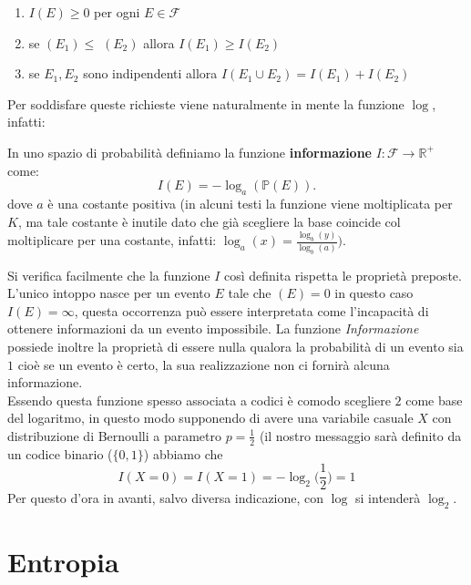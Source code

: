 \begin{enumerate} 
\item $I(E)\geq 0$ per ogni $E\in \mathcal{F}$
\item se \p$(E_1)\leq $ \p$(E_2)$ allora $I(E_1)\geq I(E_2)$ 
\item se $E_1,E_2$ sono indipendenti allora $I(E_1\cup E_2)=I(E_1)+ I(E_2)$
\end{enumerate} 
Per soddisfare queste richieste viene naturalmente in mente la funzione $\log$, infatti:
\begin{defi}
In uno spazio di probabilità \spacep definiamo la funzione \textbf{informazione} $I: \mathcal{F}\to \mathbb{R}^+$ come:
\begin{equation}
I(E)=-\log_a(\mathbb{P} (E)).
\end{equation}
dove $a$ è una costante positiva (in alcuni testi la funzione viene moltiplicata per $K$,  ma tale costante è inutile dato che già scegliere la base coincide col moltiplicare per una costante, infatti: $\log_a(x)=\frac{\log_b(y)}{\log_b(a)} \bigg)$.
\end{defi}

Si verifica facilmente che la funzione $I$ così definita rispetta le proprietà preposte. L'unico intoppo nasce per un evento $E$ tale che \p $(E)=0$ in questo caso $I(E)=\infty$, questa occorrenza può essere interpretata come l'incapacità di ottenere informazioni da un evento impossibile. La funzione \textit{Informazione} possiede inoltre la proprietà di essere nulla qualora la probabilità di un evento sia $1$ cioè se un evento è certo, la sua realizzazione non ci fornirà alcuna informazione.\\
Essendo questa funzione spesso associata a codici è comodo scegliere $2$ come base del logaritmo, in questo modo supponendo di avere una variabile casuale $X$ con distribuzione di Bernoulli a parametro $p=\frac{1}{2}$ (il nostro messaggio sarà definito da un codice binario ($\{ 0, 1 \}$) abbiamo che 
\begin{equation}
I(X=0)=I(X=1)=-\log_2 { \bigg(\frac{1}{2} \bigg )} =1
\end{equation}
Per questo d'ora in avanti, salvo diversa indicazione, con $\log$ si intenderà $\log_2$.
\vspace{15pt}

\section{Entropia}
\label{sec:Entropia}
\vspace{10pt}

